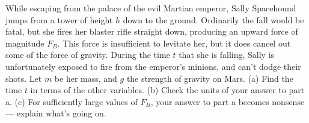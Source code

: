  While escaping from the palace of the evil Martian
emperor, Sally Spacehound jumps from a tower of height $h$
down to the ground. Ordinarily the fall would be fatal, but
she fires her blaster rifle straight down, producing an
upward force of magnitude $F_B$. This force is insufficient to levitate
her, but it does cancel out some of the force of gravity.
During the time $t$ that she is falling, Sally is unfortunately
exposed to fire from the emperor's minions, and can't dodge
their shots. Let $m$ be her mass, and $g$ the strength of
gravity on Mars.\hwendpart
 (a) Find the time $t$ in terms of the other
variables.\hwendpart
%
(b) Check the units of your answer to part a.\hwendpart
 (c) For sufficiently large values of $F_B$, your
answer to part a becomes nonsense --- explain what's going on.\answercheck\hwendpart
